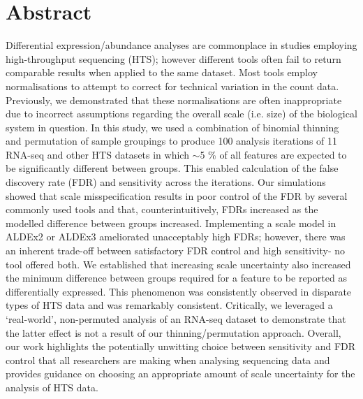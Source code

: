 \documentclass[10pt,letterpaper]{article}
\begin{document}
\section*{Abstract}
Differential expression/abundance analyses are commonplace in studies employing high-throughput sequencing (HTS); however different tools often fail to return comparable results when applied to the same dataset. Most tools employ normalisations to attempt to correct for technical variation in the count data. Previously, we demonstrated that these normalisations are often inappropriate due to incorrect assumptions regarding the overall scale (i.e. size) of the biological system in question. In this study, we used a combination of binomial thinning and permutation of sample groupings to produce 100 analysis iterations of 11 RNA-seq and other HTS datasets in which $\sim$5 \% of all features are expected to be significantly different between groups. This enabled calculation of the false discovery rate (FDR) and sensitivity across the iterations. Our simulations showed that scale misspecification results in poor control of the FDR by several commonly used tools and that, counterintuitively, FDRs increased as the modelled difference between groups increased. Implementing a scale model in ALDEx2 or ALDEx3 ameliorated unacceptably high FDRs; however, there was an inherent trade-off between satisfactory FDR control and high sensitivity- no tool offered both. We established that increasing scale uncertainty also increased the minimum difference between groups required for a feature to be reported as differentially expressed. This phenomenon was consistently observed in disparate types of HTS data and was remarkably consistent. Critically, we leveraged a `real-world’, non-permuted analysis of an RNA-seq dataset to demonstrate that the latter effect is not a result of our thinning/permutation approach. Overall, our work highlights the potentially unwitting choice between sensitivity and FDR control that all researchers are making when analysing sequencing data and provides guidance on choosing an appropriate amount of scale uncertainty for the analysis of HTS data.



%
\end{document}

